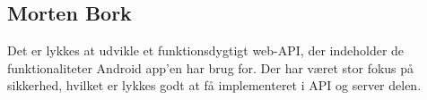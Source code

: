\subsection{Morten Bork}
Det er lykkes at udvikle et  funktionsdygtigt web-API, der indeholder de funktionaliteter Android app'en har brug for. Der har været stor fokus på sikkerhed, hvilket er lykkes godt at få implementeret i API og server delen. 
 